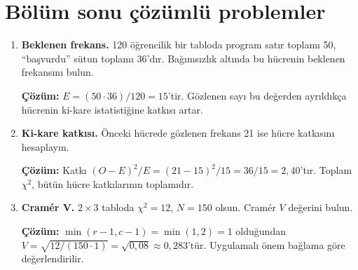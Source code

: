 \section{Bölüm sonu çözümlü problemler}

\begin{enumerate}
  \item \textbf{Beklenen frekans.} 120 öğrencilik bir tabloda program satır toplamı 50, ``başvurdu'' sütun toplamı 36'dır. Bağımsızlık altında bu hücrenin beklenen frekansını bulun.

  \textbf{Çözüm:} $E=(50\cdot36)/120=15$'tir. Gözlenen sayı bu değerden ayrıldıkça hücrenin ki-kare istatistiğine katkısı artar.

  \item \textbf{Ki-kare katkısı.} Önceki hücrede gözlenen frekans 21 ise hücre katkısını hesaplayın.

  \textbf{Çözüm:} Katkı $(O-E)^2/E=(21-15)^2/15=36/15=2{,}40$'tır. Toplam $\chi^2$, bütün hücre katkılarının toplamıdır.

  \item \textbf{Cramér V.} $2\times3$ tabloda $\chi^2=12$, $N=150$ olsun. Cramér $V$ değerini bulun.

  \textbf{Çözüm:} $\min(r-1,c-1)=\min(1,2)=1$ olduğundan $V=\sqrt{12/(150\cdot1)}=\sqrt{0{,}08}\approx0{,}283$'tür. Uygulamalı önem bağlama göre değerlendirilir.
\end{enumerate}